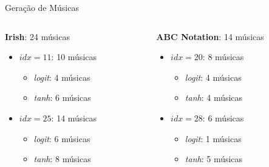 \documentclass[xcolor=table]{beamer}
\begin{document}
    \begin{frame}{Geração de Músicas}
        \vspace{-1cm}
        \begin{columns}[onlytextwidth,t]
            \begin{column}{0.48\textwidth}
                \centering
                \textbf{Irish}: 24 músicas
                \vspace{0.1cm}
                \begin{itemize}
                    \item $idx=11$: 10 músicas
                    \begin{itemize}
                        \item \textit{logit}: 4 músicas
                        \item \textit{tanh}: 6 músicas
                    \end{itemize}
                    \vspace{0.25cm}
                    \item $idx=25$: 14 músicas
                    \begin{itemize}
                        \item \textit{logit}: 6 músicas 
                        \item \textit{tanh}: 8 músicas
                    \end{itemize}
                \end{itemize}
            \end{column}

            \begin{column}{0.48\textwidth}
                \centering
                \textbf{ABC Notation}: 14 músicas
                \vspace{0.1cm}
                \begin{itemize}
                    \item $idx=20$: 8 músicas
                    \begin{itemize}
                        \item \textit{logit}: 4 músicas
                        \item \textit{tanh}: 4 músicas
                    \end{itemize}
                    \vspace{0.25cm}
                    \item $idx=28$: 6 músicas
                    \begin{itemize}
                        \item \textit{logit}: 1 músicas
                        \item \textit{tanh}: 5 músicas
                    \end{itemize}
                \end{itemize}
            \end{column}
        \end{columns}
    \end{frame}
    
\end{document}
